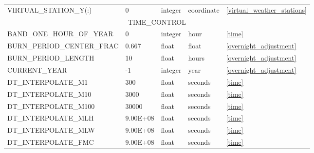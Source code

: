 \begin{landscape}
\begin{center}
\begin{longtable}{lllll}
VIRTUAL\_STATION\_Y(:)                       & 0                          & integer                & coordinate                         & \ref{virtual_weather_stations}       \\
\multicolumn{5}{c}{TIME\_CONTROL}                                                                                                                                              \\
\toprule
BAND\_ONE\_HOUR\_OF\_YEAR                    & 0                          & integer                & hour                               & \ref{time}                           \\
BURN\_PERIOD\_CENTER\_FRAC                   & 0.667                      & float                  & float                              & \ref{overnight_adjustment}           \\
BURN\_PERIOD\_LENGTH                         & 10                         & float                  & hours                              & \ref{overnight_adjustment}           \\
CURRENT\_YEAR                                & -1                         & integer                & year                               & \ref{overnight_adjustment}           \\
DT\_INTERPOLATE\_M1                          & 300                        & float                  & seconds                            & \ref{time}                           \\
DT\_INTERPOLATE\_M10                         & 3000                       & float                  & seconds                            & \ref{time}                           \\
DT\_INTERPOLATE\_M100                        & 30000                      & float                  & seconds                            & \ref{time}                           \\
DT\_INTERPOLATE\_MLH                         & 9.00E+08                   & float                  & seconds                            & \ref{time}                           \\
DT\_INTERPOLATE\_MLW                         & 9.00E+08                   & float                  & seconds                            & \ref{time}                           \\
DT\_INTERPOLATE\_FMC                         & 9.00E+08                   & float                  & seconds                            & \ref{time}                           \\

\end{longtable}
\end{center}
\end{landscape}
